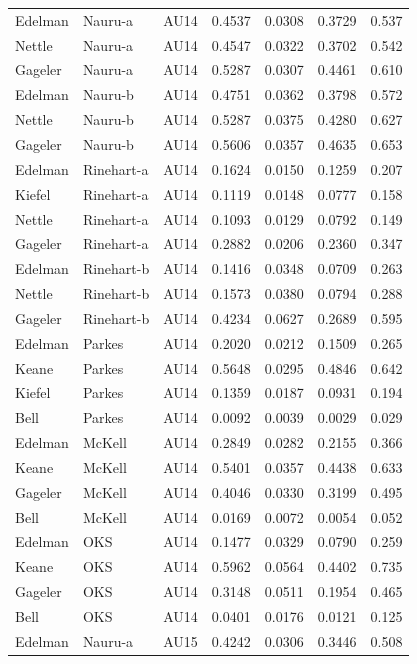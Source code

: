 \documentclass{monashthesis}
\begin{document}
\begin{center}
\begin{longtable}{lllllll}
Edelman & Nauru-a & AU14 & 0.4537 & 0.0308 & 0.3729 & 0.537 \\
Nettle & Nauru-a & AU14 & 0.4547 & 0.0322 & 0.3702 & 0.542 \\
Gageler & Nauru-a & AU14 & 0.5287 & 0.0307 & 0.4461 & 0.610 \\
Edelman & Nauru-b & AU14 & 0.4751 & 0.0362 & 0.3798 & 0.572 \\
Nettle & Nauru-b & AU14 & 0.5287 & 0.0375 & 0.4280 & 0.627 \\
Gageler & Nauru-b & AU14 & 0.5606 & 0.0357 & 0.4635 & 0.653 \\
Edelman & Rinehart-a & AU14 & 0.1624 & 0.0150 & 0.1259 & 0.207 \\
Kiefel & Rinehart-a & AU14 & 0.1119 & 0.0148 & 0.0777 & 0.158 \\
Nettle & Rinehart-a & AU14 & 0.1093 & 0.0129 & 0.0792 & 0.149 \\
Gageler & Rinehart-a & AU14 & 0.2882 & 0.0206 & 0.2360 & 0.347 \\
Edelman & Rinehart-b & AU14 & 0.1416 & 0.0348 & 0.0709 & 0.263 \\
Nettle & Rinehart-b & AU14 & 0.1573 & 0.0380 & 0.0794 & 0.288 \\
Gageler & Rinehart-b & AU14 & 0.4234 & 0.0627 & 0.2689 & 0.595 \\
Edelman & Parkes & AU14 & 0.2020 & 0.0212 & 0.1509 & 0.265 \\
Keane & Parkes & AU14 & 0.5648 & 0.0295 & 0.4846 & 0.642 \\
Kiefel & Parkes & AU14 & 0.1359 & 0.0187 & 0.0931 & 0.194 \\
Bell & Parkes & AU14 & 0.0092 & 0.0039 & 0.0029 & 0.029 \\
Edelman & McKell & AU14 & 0.2849 & 0.0282 & 0.2155 & 0.366 \\
Keane & McKell & AU14 & 0.5401 & 0.0357 & 0.4438 & 0.633 \\
Gageler & McKell & AU14 & 0.4046 & 0.0330 & 0.3199 & 0.495 \\
Bell & McKell & AU14 & 0.0169 & 0.0072 & 0.0054 & 0.052 \\
Edelman & OKS & AU14 & 0.1477 & 0.0329 & 0.0790 & 0.259 \\
Keane & OKS & AU14 & 0.5962 & 0.0564 & 0.4402 & 0.735 \\
Gageler & OKS & AU14 & 0.3148 & 0.0511 & 0.1954 & 0.465 \\
Bell & OKS & AU14 & 0.0401 & 0.0176 & 0.0121 & 0.125 \\
Edelman & Nauru-a & AU15 & 0.4242 & 0.0306 & 0.3446 & 0.508 \\

\end{longtable}
\end{center}
\end{document}
